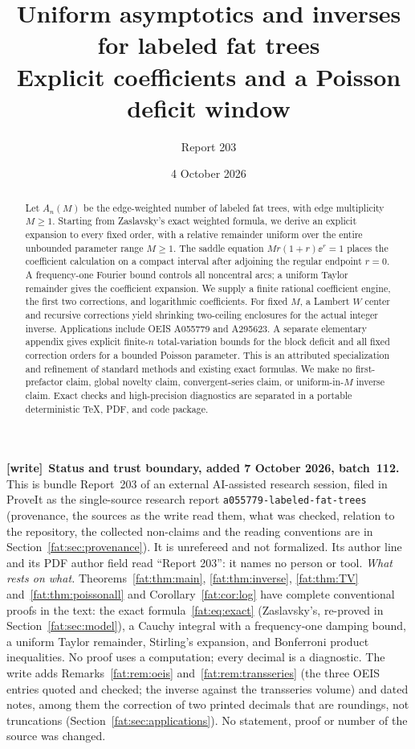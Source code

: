 \documentclass[11pt,letterpaper]{article}
\title{\LARGE\bfseries Uniform asymptotics and inverses\\for labeled fat trees\\[8pt]\large Explicit coefficients and a Poisson deficit window}
\author{Report 203}\date{4 October 2026}
\numberwithin{equation}{section}
\newcommand{\file}[1]{\nolinkurl{#1}}
\newenvironment{writenote}[1][]{\par\smallskip\begingroup\small
 \noindent\textbf{[write]}\if\relax\detokenize{#1}\relax\else~\textbf{#1.}\fi\ }%
 {\par\endgroup\smallskip}
\theoremstyle{remark}\newtheorem{remark}[theorem]{Remark}
\begin{document}
\maketitle
\begin{abstract}
Let $A_n(M)$ be the edge-weighted number of labeled fat trees, with edge multiplicity $M\ge1$. Starting from Zaslavsky's exact weighted formula, we derive an explicit expansion to every fixed order, with a relative remainder uniform over the entire unbounded parameter range $M\ge1$. The saddle equation $Mr(1+r)\ee^r=1$ places the coefficient calculation on a compact interval after adjoining the regular endpoint $r=0$. A frequency-one Fourier bound controls all noncentral arcs; a uniform Taylor remainder gives the coefficient expansion. We supply a finite rational coefficient engine, the first two corrections, and logarithmic coefficients. For fixed $M$, a Lambert $W$ center and recursive corrections yield shrinking two-ceiling enclosures for the actual integer inverse. Applications include OEIS A055779 and A295623. A separate elementary appendix gives explicit finite-$n$ total-variation bounds for the block deficit and all fixed correction orders for a bounded Poisson parameter. This is an attributed specialization and refinement of standard methods and existing exact formulas. We make no first-prefactor claim, global novelty claim, convergent-series claim, or uniform-in-$M$ inverse claim. Exact checks and high-precision diagnostics are separated in a portable deterministic TeX, PDF, and code package.
\end{abstract}
\begin{writenote}[Status and trust boundary, added 7 October 2026, batch~112]
This is bundle Report~203 of an external AI-assisted research session, filed
in ProveIt as the single-source research report
\file{a055779-labeled-fat-trees} (provenance, the sources as the write read
them, what was checked, relation to the repository, the collected non-claims
and the reading conventions are in Section~\ref{fat:sec:provenance}). It is
unrefereed and not formalized. Its author line and its PDF author field read
``Report 203'': it names no person or tool. \emph{What rests on what.}
Theorems~\ref{fat:thm:main}, \ref{fat:thm:inverse}, \ref{fat:thm:TV}
and~\ref{fat:thm:poissonall} and Corollary~\ref{fat:cor:log} have complete
conventional proofs in the text: the exact formula~\eqref{fat:eq:exact}
(Zaslavsky's, re-proved in Section~\ref{fat:sec:model}), a Cauchy integral
with a frequency-one damping bound, a uniform Taylor remainder, Stirling's
expansion, and Bonferroni product inequalities. No proof uses a computation;
every decimal is a diagnostic. The write adds Remarks~\ref{fat:rem:oeis}
and~\ref{fat:rem:transseries} (the three OEIS entries quoted and checked; the
inverse against the transseries volume) and dated notes, among them the
correction of two printed decimals that are roundings, not truncations
(Section~\ref{fat:sec:applications}). No statement, proof or number of the
source was changed.
\end{writenote}
\clearpage
{\small\setcounter{tocdepth}{1}\tableofcontents}
\newpage
\end{document}

